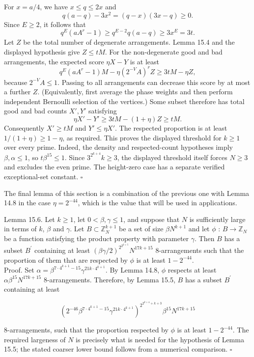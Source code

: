 \documentclass[10pt]{article}
\begin{document}
For $x=a/4$, we have $x\leqslant q\leqslant2x$ and
\[
q(a-q)-3x^2=(q-x)(3x-q)\geqslant0.
\]
Since $E\geqslant2$, it follows that
\[
q^E(aA^r-1)\geqslant q^{E-2}q(a-q)
  \geqslant3x^E=3t.
\]
Let $Z$ be the total number of degenerate arrangements. Lemma 15.4 and the displayed hypothesis give $Z\leqslant tM$. For the non-degenerate good and bad arrangements, the expected score $\eta X-Y$ is at least
\[
q^E(aA^r-1)M-\eta(2^{-V}A)^r Z
  \geqslant3tM-\eta Z,
\]
because $2^{-V}A\leqslant1$. Passing to all arrangements can decrease this score by at most a further $Z$. (Equivalently, first average the phase weights and then perform independent Bernoulli selection of the vertices.) Some subset therefore has total good and bad counts $X',Y'$ satisfying
\[
\eta X'-Y'\geqslant3tM-(1+\eta)Z\geqslant tM.
\]
Consequently $X'\geqslant tM$ and $Y'\leqslant\eta X'$. The respected proportion is at least $1/(1+\eta)\geqslant1-\eta$, as required. This proves the displayed threshold for $k\geqslant1$ over every prime. Indeed, the density and respected-count hypotheses imply $\beta,\alpha\leqslant1$, so $t\beta^{15}\leqslant1$. Since $3^{2^{k+4}}k\geqslant3$, the displayed threshold itself forces $N\geqslant3$ and excludes the even prime. The height-zero case has a separate verified exceptional-set constant. \(\square\)

The final lemma of this section is a combination of the previous one with Lemma 14.8 in the case $\eta=2^{-44}$, which is the value that will be used in applications.

Lemma 15.6. Let $k\geqslant1$, let $0<\beta,\gamma\leqslant1$, and suppose that $N$ is sufficiently large in terms of $k$, $\beta$ and $\gamma$. Let $B \subset \mathbb{Z}_{N}^{k+1}$ be a set of size $\beta N^{k+1}$ and let $\phi$ : $B \rightarrow \mathbb{Z}_{N}$ be a function satisfying the product property with parameter $\gamma$. Then $B$ has a subset $B^{\prime}$ containing at least $(\beta \gamma / 2)^{2^{2^{k+5}}} N^{17 k+15}$ 8-arrangements such that the proportion of them that are respected by $\phi$ is at least $1-2^{-44}$.\\
Proof. Set $\alpha=\beta^{7\cdot4^{k+1}-15}\gamma^{21k\cdot4^{k+1}}$. By Lemma 14.8, $\phi$ respects at least $\alpha\beta^{15}N^{17k+15}$ 8-arrangements. Therefore, by Lemma 15.5, $B$ has a subset $B^{\prime}$ containing at least

$$
\left(2^{-46}\beta^{7\cdot4^{k+1}-15}\gamma^{21k\cdot4^{k+1}}\right)^{2^{2^{k+4}+k+3}}\beta^{15}N^{17k+15}
$$

8-arrangements, such that the proportion respected by $\phi$ is at least $1-2^{-44}$. The required largeness of $N$ is precisely what is needed for the hypothesis of Lemma 15.5; the stated coarser lower bound follows from a numerical comparison. \(\square\)
\end{document}
